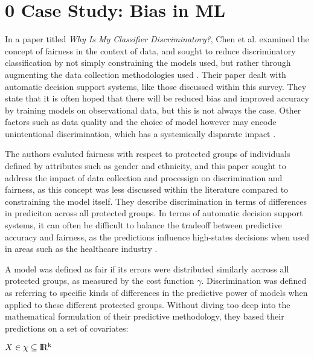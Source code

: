 \documentclass[12pt]{article}
\begin{document}



\section{\hspace{-3mm} 0  Case Study: Bias in ML}

In a paper titled \textit{Why Is My Classifier Discriminatory?}, Chen et al. examined the concept of fairness in the context of data, and sought to reduce discriminatory classification by not simply constraining the models used, but rather through augmenting the data collection methodologies used \cite{Chen_2018}. Their paper dealt with automatic decision support systems, like those discussed within this survey. They state that it is often hoped that there will be reduced bias and improved accuracy by training models on observational data, but this is not always the case. Other factors such as data quality and the choice of model however may encode unintentional discrimination, which has a systemically disparate impact \cite{Chen_2018}.\

The authors evaluted fairness with respect to protected groups of individuals defined by attributes such as gender and ethnicity, and this paper sought to address the impact of data collection and processign on discrimination and fairness, as this concept was less discussed within the literature compared to constraining the model itself. They describe discrimination in terms of differences in prediciton across all protected groups. In terms of automatic decision support systems, it can often be difficult to balance the tradeoff between predictive accuracy and fairness, as the predictions influence high-states decisions when used in areas such as the healthcare industry \cite{Chen_2018}.\

A model was defined as fair if its errors were distributed similarly accross all protected groups, as measured by the cost function $\gamma$. Discrimination was defined as referring to specific kinds of differences in the predictive power of models when applied to these different protected groups. Without diving too deep into the mathematical formulation of their predictive methodology, they based their predictions on a set of covariates:

\begin{center}
    $X \in \chi \subseteq \rm I\!R^k$
\end{center}
\end{document}
